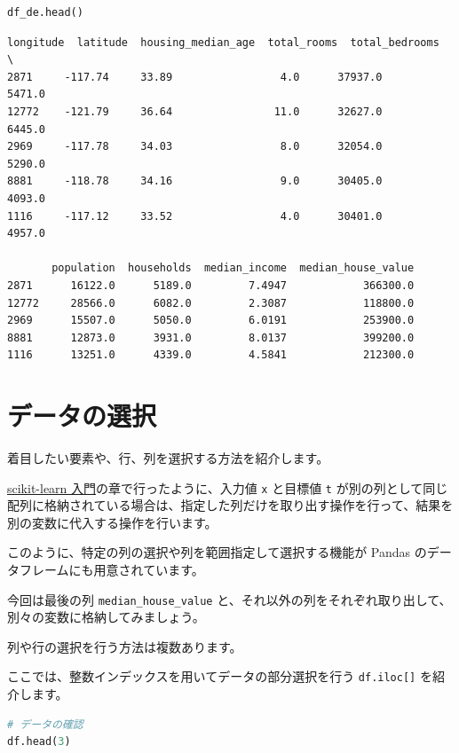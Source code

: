 \begin{lstlisting}[style=codecell,language=Python]
df_de.head()
\end{lstlisting}

\begin{lstlisting}[style=outputcell]
       longitude  latitude  housing_median_age  total_rooms  total_bedrooms  \
2871     -117.74     33.89                 4.0      37937.0          5471.0   
12772    -121.79     36.64                11.0      32627.0          6445.0   
2969     -117.78     34.03                 8.0      32054.0          5290.0   
8881     -118.78     34.16                 9.0      30405.0          4093.0   
1116     -117.12     33.52                 4.0      30401.0          4957.0   

       population  households  median_income  median_house_value  
2871      16122.0      5189.0         7.4947            366300.0  
12772     28566.0      6082.0         2.3087            118800.0  
2969      15507.0      5050.0         6.0191            253900.0  
8881      12873.0      3931.0         8.0137            399200.0  
1116      13251.0      4339.0         4.5841            212300.0  
\end{lstlisting}

\section{データの選択}


着目したい要素や、行、列を選択する方法を紹介します。

\href{https://tutorials.chainer.org/ja/09_Introduction_to_Scikit-learn.html}{scikit-learn 入門}の章で行ったように、入力値 \texttt{x} と目標値 \texttt{t} が別の列として同じ配列に格納されている場合は、指定した列だけを取り出す操作を行って、結果を別の変数に代入する操作を行います。

このように、特定の列の選択や列を範囲指定して選択する機能が Pandas のデータフレームにも用意されています。


今回は最後の列 \texttt{median\_house\_value} と、それ以外の列をそれぞれ取り出して、別々の変数に格納してみましょう。


列や行の選択を行う方法は複数あります。

ここでは、整数インデックスを用いてデータの部分選択を行う \texttt{df.iloc[]} を紹介します。


\begin{lstlisting}[style=codecell,language=Python]
# データの確認
df.head(3)
\end{lstlisting}

